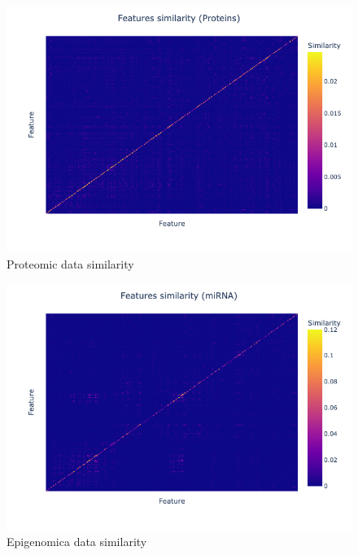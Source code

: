 \documentclass[12pt,a4paper]{article}
\begin{document}
\begin{figure}[htbp!]
\begin{center}
\includegraphics[width=0.9\columnwidth]{./static/proteins_similarity_heatmap.png}
\end{center}
\caption{Proteomic data similarity}
\label{fig:proteins_similarity_heatmap}
\end{figure}

\begin{figure}[htbp!]
\begin{center}
\includegraphics[width=0.9\columnwidth]{./static/miRNA_similarity_heatmap.png}
\end{center}
\caption{Epigenomica data similarity}
\label{fig:miRNA_similarity_heatmap}
\end{figure}
\end{document}
